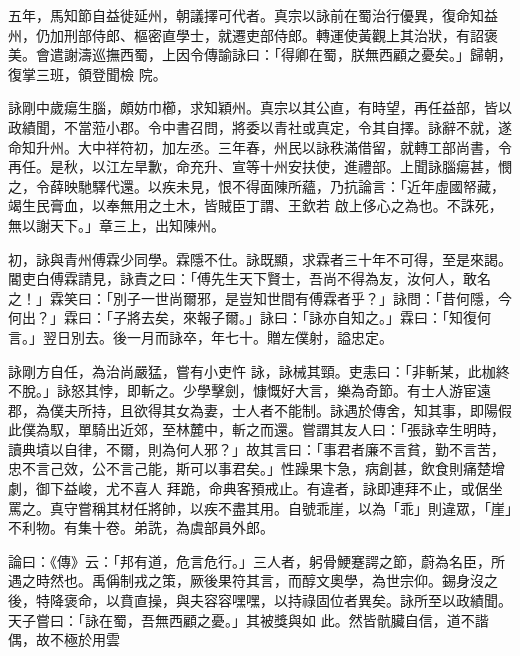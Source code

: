 \begin{pinyinscope}
 五年，馬知節自益徙延州，朝議擇可代者。真宗以詠前在蜀治行優異，復命知益州，仍加刑部侍郎、樞密直學士，就遷吏部侍郎。轉運使黃觀上其治狀，有詔褒美。會遣謝濤巡撫西蜀，上因令傳諭詠曰：「得卿在蜀，朕無西顧之憂矣。」歸朝，復掌三班，領登聞檢
 院。



 詠剛中歲瘍生腦，頗妨巾櫛，求知穎州。真宗以其公直，有時望，再任益部，皆以政績聞，不當蒞小郡。令中書召問，將委以青社或真定，令其自擇。詠辭不就，遂命知升州。大中祥符初，加左丞。三年春，州民以詠秩滿借留，就轉工部尚書，令再任。是秋，以江左旱歉，命充升、宣等十州安扶使，進禮部。上聞詠腦瘍甚，憫之，令薛映馳驛代還。以疾未見，恨不得面陳所蘊，乃抗論言：「近年虛國帑藏，竭生民膏血，以奉無用之土木，皆賊臣丁謂、王欽若
 啟上侈心之為也。不誅死，無以謝天下。」章三上，出知陳州。



 初，詠與青州傅霖少同學。霖隱不仕。詠既顯，求霖者三十年不可得，至是來謁。閽吏白傅霖請見，詠責之曰：「傅先生天下賢士，吾尚不得為友，汝何人，敢名之！」霖笑曰：「別子一世尚爾邪，是豈知世間有傅霖者乎？」詠問：「昔何隱，今何出？」霖曰：「子將去矣，來報子爾。」詠曰：「詠亦自知之。」霖曰：「知復何言。」翌日別去。後一月而詠卒，年七十。贈左僕射，謚忠定。



 詠剛方自任，為治尚嚴猛，嘗有小吏忤
 詠，詠械其頸。吏恚曰：「非斬某，此枷終不脫。」詠怒其悖，即斬之。少學擊劍，慷慨好大言，樂為奇節。有士人游宦遠郡，為僕夫所持，且欲得其女為妻，士人者不能制。詠遇於傳舍，知其事，即陽假此僕為馭，單騎出近郊，至林麓中，斬之而還。嘗謂其友人曰：「張詠幸生明時，讀典墳以自律，不爾，則為何人邪？」故其言曰：「事君者廉不言貧，勤不言苦，忠不言己效，公不言己能，斯可以事君矣。」性躁果卞急，病創甚，飲食則痛楚增劇，御下益峻，尤不喜人
 拜跪，命典客預戒止。有違者，詠即連拜不止，或倨坐罵之。真守嘗稱其材任將帥，以疾不盡其用。自號乖崖，以為「乖」則違眾，「崖」不利物。有集十卷。弟詵，為虞部員外郎。



 論曰：《傳》云：「邦有道，危言危行。」三人者，躬骨鯁蹇諤之節，蔚為名臣，所遇之時然也。禹偁制戎之策，厥後果符其言，而醇文奧學，為世宗仰。錫身沒之後，特降褒命，以賁直操，與夫容容嘿嘿，以持祿固位者異矣。詠所至以政績聞。天子嘗曰：「詠在蜀，吾無西顧之憂。」其被獎與如
 此。然皆骯臟自信，道不諧偶，故不極於用雲



\end{pinyinscope}